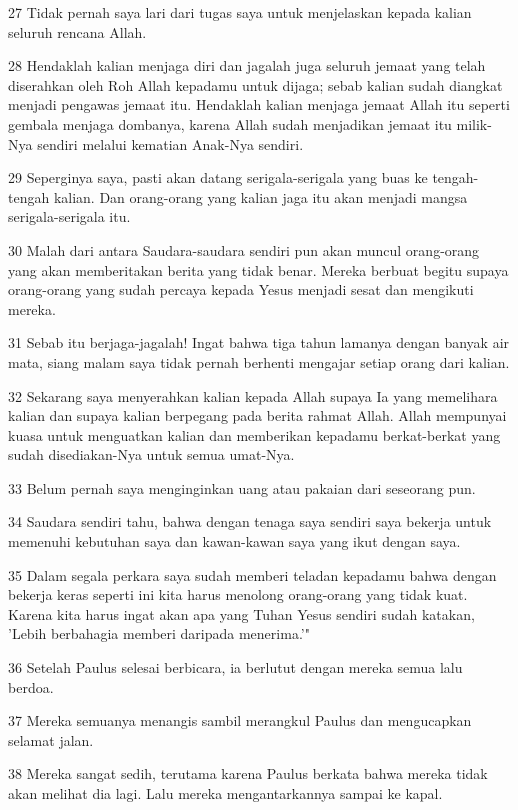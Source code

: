 \par 27 Tidak pernah saya lari dari tugas saya untuk menjelaskan kepada kalian seluruh rencana Allah.
\par 28 Hendaklah kalian menjaga diri dan jagalah juga seluruh jemaat yang telah diserahkan oleh Roh Allah kepadamu untuk dijaga; sebab kalian sudah diangkat menjadi pengawas jemaat itu. Hendaklah kalian menjaga jemaat Allah itu seperti gembala menjaga dombanya, karena Allah sudah menjadikan jemaat itu milik-Nya sendiri melalui kematian Anak-Nya sendiri.
\par 29 Seperginya saya, pasti akan datang serigala-serigala yang buas ke tengah-tengah kalian. Dan orang-orang yang kalian jaga itu akan menjadi mangsa serigala-serigala itu.
\par 30 Malah dari antara Saudara-saudara sendiri pun akan muncul orang-orang yang akan memberitakan berita yang tidak benar. Mereka berbuat begitu supaya orang-orang yang sudah percaya kepada Yesus menjadi sesat dan mengikuti mereka.
\par 31 Sebab itu berjaga-jagalah! Ingat bahwa tiga tahun lamanya dengan banyak air mata, siang malam saya tidak pernah berhenti mengajar setiap orang dari kalian.
\par 32 Sekarang saya menyerahkan kalian kepada Allah supaya Ia yang memelihara kalian dan supaya kalian berpegang pada berita rahmat Allah. Allah mempunyai kuasa untuk menguatkan kalian dan memberikan kepadamu berkat-berkat yang sudah disediakan-Nya untuk semua umat-Nya.
\par 33 Belum pernah saya menginginkan uang atau pakaian dari seseorang pun.
\par 34 Saudara sendiri tahu, bahwa dengan tenaga saya sendiri saya bekerja untuk memenuhi kebutuhan saya dan kawan-kawan saya yang ikut dengan saya.
\par 35 Dalam segala perkara saya sudah memberi teladan kepadamu bahwa dengan bekerja keras seperti ini kita harus menolong orang-orang yang tidak kuat. Karena kita harus ingat akan apa yang Tuhan Yesus sendiri sudah katakan, 'Lebih berbahagia memberi daripada menerima.'"
\par 36 Setelah Paulus selesai berbicara, ia berlutut dengan mereka semua lalu berdoa.
\par 37 Mereka semuanya menangis sambil merangkul Paulus dan mengucapkan selamat jalan.
\par 38 Mereka sangat sedih, terutama karena Paulus berkata bahwa mereka tidak akan melihat dia lagi. Lalu mereka mengantarkannya sampai ke kapal.

